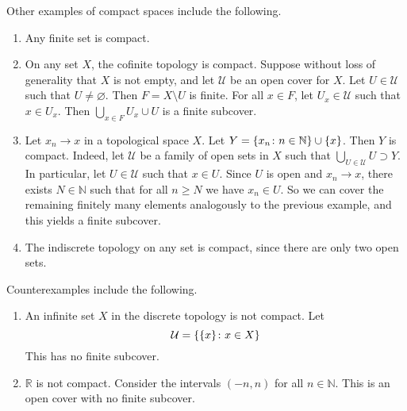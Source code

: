 \begin{example}
	Other examples of compact spaces include the following.
	\begin{enumerate}
		\item Any finite set is compact.
		\item On any set \( X \), the cofinite topology is compact.
		      Suppose without loss of generality that \( X \) is not empty, and let \( \mathcal U \) be an open cover for \( X \).
		      Let \( U \in \mathcal U \) such that \( U \neq \varnothing \).
		      Then \( F = X \setminus U \) is finite.
		      For all \( x \in F \), let \( U_x \in \mathcal U \) such that \( x \in U_x \).
		      Then \( \bigcup_{x \in F} U_x \cup U \) is a finite subcover.
		\item Let \( x_n \to x \) in a topological space \( X \).
		      Let \( Y = \qty{x_n \colon n \in \mathbb N} \cup \qty{x} \).
		      Then \( Y \) is compact.
		      Indeed, let \( \mathcal U \) be a family of open sets in \( X \) such that \( \bigcup_{U \in \mathcal U} U \supset Y \).
		      In particular, let \( U \in \mathcal U \) such that \( x \in U \).
		      Since \( U \) is open and \( x_n \to x \), there exists \( N \in \mathbb N \) such that for all \( n \geq N \) we have \( x_n \in U \).
		      So we can cover the remaining finitely many elements analogously to the previous example, and this yields a finite subcover.
		\item The indiscrete topology on any set is compact, since there are only two open sets.
	\end{enumerate}
	Counterexamples include the following.
	\begin{enumerate}
		\item An infinite set \( X \) in the discrete topology is not compact.
		      Let
		      \[
			      \mathcal U = \qty{\qty{x} \colon x \in X}
		      \]
		      This has no finite subcover.
		\item \( \mathbb R \) is not compact.
		      Consider the intervals \( (-n, n) \) for all \( n \in \mathbb N \).
		      This is an open cover with no finite subcover.
	\end{enumerate}
\end{example}

